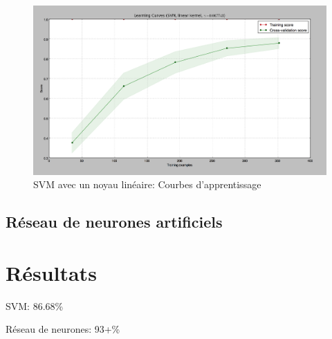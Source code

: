\begin{figure}[!h]
\includegraphics[width=\textwidth]{pictures/hog-svm-training}
\caption{SVM avec un noyau linéaire: Courbes d'apprentissage}
\label{fig:hog-svm-training}
\end{figure}

\subsection{Réseau de neurones artificiels}

\section{Résultats}

SVM: 86.68\%

Réseau de neurones: 93+\%

